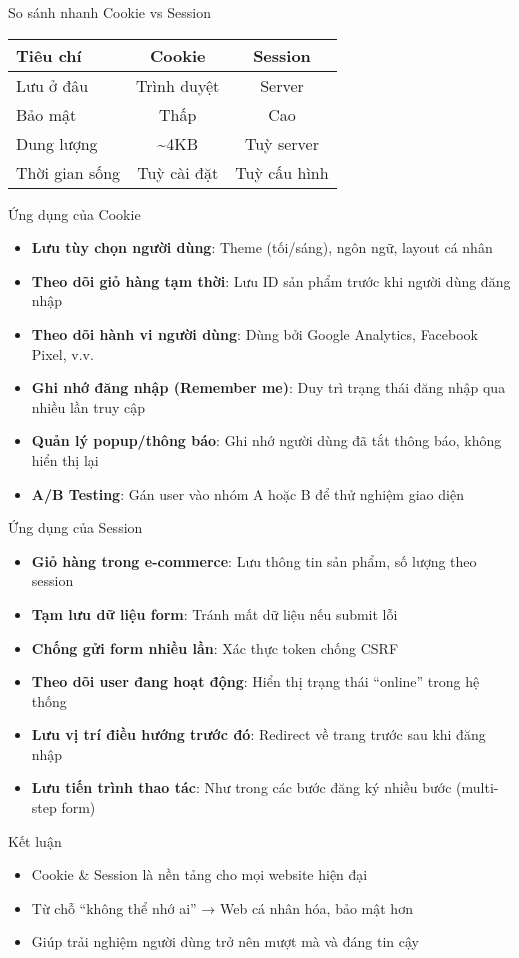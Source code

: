\documentclass[aspectratio=169]{beamer}
\begin{document}
\begin{frame}{So sánh nhanh Cookie vs Session}
  \begin{tabular}{|l|c|c|}
    \hline
    \textbf{Tiêu chí} & \textbf{Cookie} & \textbf{Session} \\
    \hline
    Lưu ở đâu         & Trình duyệt     & Server \\
    \hline
    Bảo mật           & Thấp            & Cao \\
    \hline
    Dung lượng        & \textasciitilde 4KB & Tuỳ server \\
    \hline
    Thời gian sống    & Tuỳ cài đặt     & Tuỳ cấu hình \\
    \hline
  \end{tabular}
\end{frame}

\begin{frame}{Ứng dụng của Cookie}
  \begin{itemize}
    \item \textbf{Lưu tùy chọn người dùng}: Theme (tối/sáng), ngôn ngữ, layout cá nhân
    \item \textbf{Theo dõi giỏ hàng tạm thời}: Lưu ID sản phẩm trước khi người dùng đăng nhập
    \item \textbf{Theo dõi hành vi người dùng}: Dùng bởi Google Analytics, Facebook Pixel, v.v.
    \item \textbf{Ghi nhớ đăng nhập (Remember me)}: Duy trì trạng thái đăng nhập qua nhiều lần truy cập
    \item \textbf{Quản lý popup/thông báo}: Ghi nhớ người dùng đã tắt thông báo, không hiển thị lại
    \item \textbf{A/B Testing}: Gán user vào nhóm A hoặc B để thử nghiệm giao diện
  \end{itemize}
\end{frame}

\begin{frame}{Ứng dụng của Session}
  \begin{itemize}
    \item \textbf{Giỏ hàng trong e-commerce}: Lưu thông tin sản phẩm, số lượng theo session
    \item \textbf{Tạm lưu dữ liệu form}: Tránh mất dữ liệu nếu submit lỗi
    \item \textbf{Chống gửi form nhiều lần}: Xác thực token chống CSRF
    \item \textbf{Theo dõi user đang hoạt động}: Hiển thị trạng thái “online” trong hệ thống
    \item \textbf{Lưu vị trí điều hướng trước đó}: Redirect về trang trước sau khi đăng nhập
    \item \textbf{Lưu tiến trình thao tác}: Như trong các bước đăng ký nhiều bước (multi-step form)
  \end{itemize}
\end{frame}

\begin{frame}{Kết luận}
  \begin{itemize}
    \item Cookie \& Session là nền tảng cho mọi website hiện đại
    \item Từ chỗ ``không thể nhớ ai'' → Web cá nhân hóa, bảo mật hơn
    \item Giúp trải nghiệm người dùng trở nên mượt mà và đáng tin cậy
  \end{itemize}
\end{frame}
\end{document}
